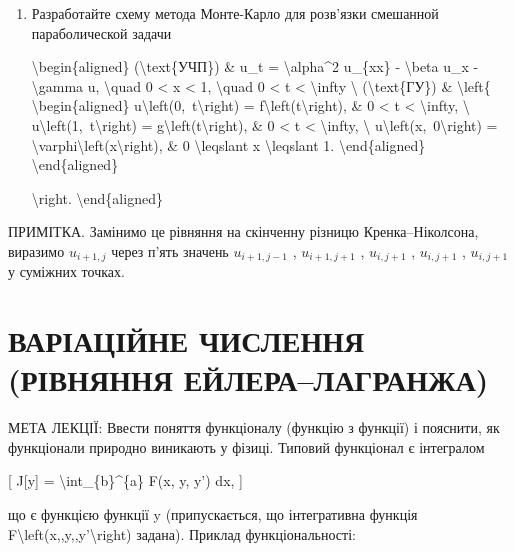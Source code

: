 \documentclass[
]{article}
\begin{document}
\begin{enumerate}
\def\labelenumi{\arabic{enumi}.}
\setcounter{enumi}{4}
\item
  Разработайте схему метода Монте-Карло для розв'язки смешанной
  параболической задачи

  \textbackslash begin\{aligned\} (\textbackslash text\{УЧП\}) \& u\_t =
  \textbackslash alpha\^{}2 u\_\{xx\} - \textbackslash beta u\_x -
  \textbackslash gamma u, \textbackslash quad 0 \textless{} x
  \textless{} 1, \textbackslash quad 0 \textless{} t \textless{}
  \textbackslash infty \textbackslash{} (\textbackslash text\{ГУ\}) \&
  \textbackslash left\{ \textbackslash begin\{aligned\}
  u\textbackslash left(0,~t\textbackslash right) =
  f\textbackslash left(t\textbackslash right), \& 0 \textless{} t
  \textless{} \textbackslash infty, \textbackslash{}
  u\textbackslash left(1,~t\textbackslash right) =
  g\textbackslash left(t\textbackslash right), \& 0 \textless{} t
  \textless{} \textbackslash infty, \textbackslash{}
  u\textbackslash left(x,~0\textbackslash right) =
  \textbackslash varphi\textbackslash left(x\textbackslash right), \& 0
  \textbackslash leqslant x \textbackslash leqslant 1.
  \textbackslash end\{aligned\} \textbackslash end\{aligned\}

  \textbackslash right. \textbackslash end\{aligned\}
\end{enumerate}

ПРИМІТКА. Замінимо це рівняння на скінченну різницю Кренка--Ніколсона,
виразимо \(u_{i+1,j}\) через п'ять значень \(u_{i+1,j-1}\) ,
\(u_{i+1,j+1}\) , \(u_{i,j+1}\) , \(u_{i,j+1}\) , \(u_{i,j+1}\) у
суміжних точках.

\section{ВАРІАЦІЙНЕ ЧИСЛЕННЯ (РІВНЯННЯ
ЕЙЛЕРА--ЛАГРАНЖА)}\label{ux432ux430ux440ux456ux430ux446ux456ux439ux43dux435-ux447ux438ux441ux43bux435ux43dux43dux44f-ux440ux456ux432ux43dux44fux43dux43dux44f-ux435ux439ux43bux435ux440ux430ux43bux430ux433ux440ux430ux43dux436ux430}

МЕТА ЛЕКЦІЇ: Ввести поняття функціоналу (функцію з функції) і пояснити,
як функціонали природно виникають у фізиці. Типовий функціонал є
інтегралом

{[} J{[}y{]} = \textbackslash int\_\{b\}\^{}\{a\} F(x, y, y') dx, {]}

що є функцією функції y (припускається, що інтегративна функція
F\textbackslash left(x,,y,,y'\textbackslash right) задана). Приклад
функціональності:
\end{document}
